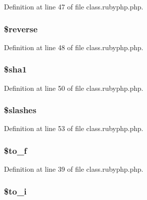 Definition at line 47 of file class.\-rubyphp.\-php.

\hypertarget{classr_ae0d210fd358fa750a11e63b26f6d26ea}{
\subsubsection[{\$reverse}]{\setlength{\rightskip}{0pt plus 5cm}\${\bf reverse}}}\label{classr_ae0d210fd358fa750a11e63b26f6d26ea}


Definition at line 48 of file class.\-rubyphp.\-php.

\hypertarget{classr_a310d84f0b735d2ab692b4e2acd90e7ef}{
\subsubsection[{\$sha1}]{\setlength{\rightskip}{0pt plus 5cm}\${\bf sha1}}}\label{classr_a310d84f0b735d2ab692b4e2acd90e7ef}


Definition at line 50 of file class.\-rubyphp.\-php.

\hypertarget{classr_ac95fd27a35f2d9674ef3760a4ea1d07f}{
\subsubsection[{\$slashes}]{\setlength{\rightskip}{0pt plus 5cm}\${\bf slashes}}}\label{classr_ac95fd27a35f2d9674ef3760a4ea1d07f}


Definition at line 53 of file class.\-rubyphp.\-php.

\hypertarget{classr_a85a2ada0b16d9e59f094e77df5848459}{
\subsubsection[{\$to\-\_\-f}]{\setlength{\rightskip}{0pt plus 5cm}\${\bf to\-\_\-f}}}\label{classr_a85a2ada0b16d9e59f094e77df5848459}


Definition at line 39 of file class.\-rubyphp.\-php.

\hypertarget{classr_afecc47a810cf510aff6387286b9c0e73}{
\subsubsection[{\$to\-\_\-i}]{\setlength{\rightskip}{0pt plus 5cm}\${\bf to\-\_\-i}}}\label{classr_afecc47a810cf510aff6387286b9c0e73}



